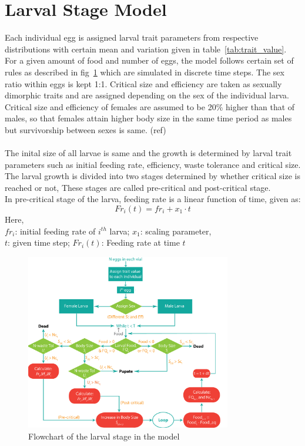 \section{Larval Stage Model}
Each individual egg is assigned larval trait parameters from respective distributions with certain mean and variation given in table~\ref{tab:trait_value}. For a given amount of food and number of eggs, the model follows certain set of rules as described in fig~\ref{fig:larval_model} which are simulated in discrete time steps. The sex ratio within eggs is kept 1:1. Critical size and efficiency are taken as sexually dimorphic traits and are assigned depending on the sex of the individual larva. Critical size and efficiency of females are assumed to be 20\% higher than that of males, so that females attain higher body size in the same time period as males but survivorship between sexes is same. (ref)\\ \\
The inital size of all larvae is same and the growth is determined by larval trait parameters such as initial feeding rate, efficiency, waste tolerance and critical size. The larval growth is divided into two stages determined by whether critical size is reached or not, These stages are called pre-critical and post-critical stage. \\
In pre-critical stage of the larva, feeding rate is a linear function of time, given as:
\[Fr_{i}(t) = fr_{i} + x_{1}\cdot t\]
Here, \\
$fr_{i}$: initial feeding rate of $i^{th}$ larva; $x_{1}$: scaling parameter, \\
$t$: given time step; $Fr_{i}(t)$: Feeding rate at time $t$\\
\begin{figure}[h]
  \centering
  \includegraphics[width=0.8\textwidth]{C2/Figs/larval_model}
  \caption{Flowchart of the larval stage in the model}
  \label{fig:larval_model}
\end{figure}

